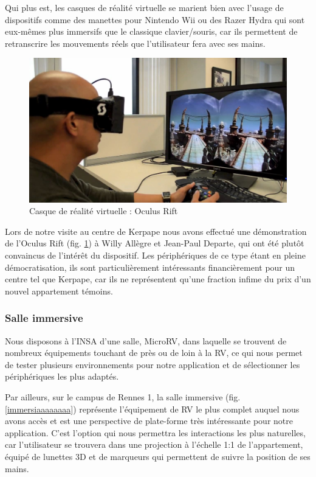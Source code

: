 Qui plus est, les casques de réalité virtuelle se marient bien avec l'usage de dispositifs comme des manettes pour Nintendo Wii ou des Razer Hydra qui sont eux-mêmes plus immersifs que le classique clavier/souris, car ils permettent de retranscrire les mouvements réels que l'utilisateur fera avec ses mains.
\begin{figure}
  \centering
  \includegraphics[scale=0.3]{2-Specifications/img-utilisateur/occulus.jpg}
	\caption{Casque de réalité virtuelle : Oculus Rift}
	\label{oculus_reparo}
\end{figure}
Lors de notre visite au centre de Kerpape nous avons effectué une démonstration de l'Oculus Rift (fig. \ref{oculus_reparo}) à Willy Allègre et Jean-Paul Departe, qui ont été plutôt convaincus de l'intérêt du dispositif. 
Les périphériques de ce type étant en pleine démocratisation, ils sont particulièrement intéressants financièrement pour un centre tel que Kerpape, car ils ne représentent qu'une fraction infime du prix d'un nouvel appartement témoins.

\subsubsection{Salle immersive}
Nous disposons à l'INSA d'une salle, MicroRV, dans laquelle se trouvent de nombreux équipements touchant de près ou de loin à la RV, ce qui nous permet de tester plusieurs environnements pour notre application et de sélectionner les périphériques les plus adaptés.

Par ailleurs, sur le campus de Rennes 1, la salle immersive (fig. \ref{immersiaaaaaaaa}) représente l'équipement de RV le plus complet auquel nous avons accès et est une perspective de plate-forme très intéressante pour notre application. C'est l'option qui nous permettra les interactions les plus naturelles, car l'utilisateur se trouvera dans une projection à l'échelle 1:1 de l'appartement, équipé de lunettes 3D et de marqueurs qui permettent de suivre la position de ses mains.

